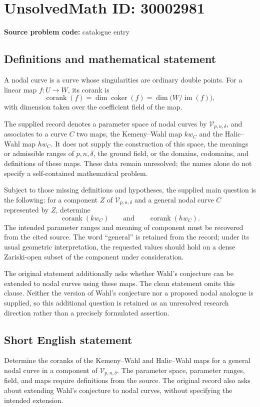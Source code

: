 \documentclass[11pt]{article}
\begin{document}
\section*{UnsolvedMath ID: 30002981}
\textbf{Source problem code:} catalogue entry
\subsection{Definitions and mathematical statement}
A nodal curve is a curve whose singularities are ordinary double points. For a linear map \(f\colon U\to W\), its corank is
\[
\operatorname{corank}(f)=\dim\operatorname{coker}(f)=\dim\bigl(W/\operatorname{im}(f)\bigr),
\]
with dimension taken over the coefficient field of the map.

The supplied record denotes a parameter space of nodal curves by \(\mathcal V_{p,n,\delta}\), and associates to a curve \(C\) two maps, the Kemeny--Wahl map \(kw_C\) and the Halic--Wahl map \(hw_C\). It does not supply the construction of this space, the meanings or admissible ranges of \(p,n,\delta\), the ground field, or the domains, codomains, and definitions of these maps. These data remain unresolved; the names alone do not specify a self-contained mathematical problem.

Subject to those missing definitions and hypotheses, the supplied main question is the following: for a component \(Z\) of \(\mathcal V_{p,n,\delta}\) and a general nodal curve \(C\) represented by \(Z\), determine
\[
\operatorname{corank}(kw_C)
\qquad\text{and}\qquad
\operatorname{corank}(hw_C).
\]
The intended parameter ranges and meaning of component must be recovered from the cited source. The word ``general'' is retained from the record; under its usual geometric interpretation, the requested values should hold on a dense Zariski-open subset of the component under consideration.

The original statement additionally asks whether Wahl's conjecture can be extended to nodal curves using these maps. The clean statement omits this clause. Neither the version of Wahl's conjecture nor a proposed nodal analogue is supplied, so this additional question is retained as an unresolved research direction rather than a precisely formulated assertion.
\subsection{Short English statement}
Determine the coranks of the Kemeny--Wahl and Halic--Wahl maps for a general nodal curve in a component of \(\mathcal V_{p,n,\delta}\). The parameter space, parameter ranges, field, and maps require definitions from the source. The original record also asks about extending Wahl's conjecture to nodal curves, without specifying the intended extension.
\end{document}
